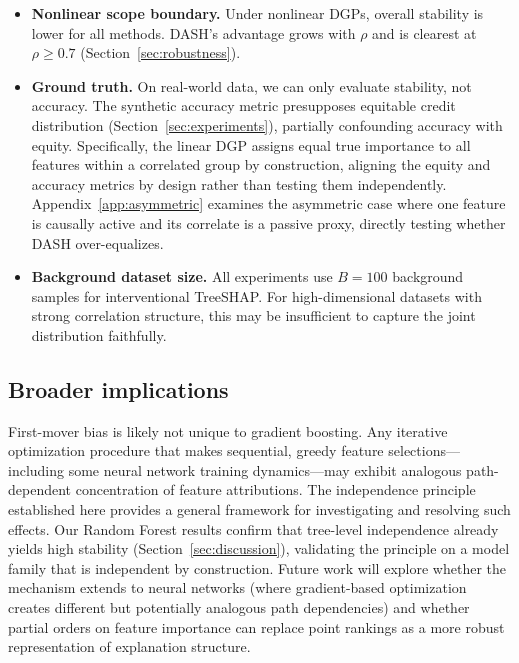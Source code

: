 \documentclass[11pt]{article}
\newcommand{\dash}{\textsc{DASH}}
\newcommand{\rhovar}{\rho}
\begin{document}
\begin{itemize}
    where diagonal entries are main effects and off-diagonal entries
    are pairwise interactions. Averaging these tensors element-wise
    across the ensemble would yield stable interaction estimates
    by the same independence argument. The computational cost is
    $O(TLD^2)$ per model (vs.\ $O(TLD)$ for standard SHAP), making
    this practical for moderate $P$ but expensive for large feature
    spaces.
  \item \textbf{Nonlinear scope boundary.} Under nonlinear DGPs,
    overall stability is lower for all methods. \dash{}'s advantage
    grows with $\rhovar$ and is clearest at $\rhovar \geq 0.7$
    (Section~\ref{sec:robustness}).
  \item \textbf{Ground truth.} On real-world data, we can only evaluate
    stability, not accuracy. The synthetic accuracy metric presupposes
    equitable credit distribution (Section~\ref{sec:experiments}),
    partially confounding accuracy with equity. Specifically, the
    linear DGP assigns equal true importance to all features within a
    correlated group by construction, aligning the equity and accuracy
    metrics by design rather than testing them independently.
    Appendix~\ref{app:asymmetric} examines the asymmetric case where
    one feature is causally active and its correlate is a passive proxy,
    directly testing whether \dash{} over-equalizes.
  \item \textbf{Background dataset size.} All experiments use $B = 100$
    background samples for interventional TreeSHAP. For high-dimensional
    datasets with strong correlation structure, this may be insufficient
    to capture the joint distribution faithfully.
\end{itemize}

\subsection{Broader implications}

First-mover bias is likely not unique to gradient boosting. Any
iterative optimization procedure that makes sequential, greedy feature
selections---including some neural network training dynamics---may exhibit
analogous path-dependent concentration of feature attributions. The
independence principle established here provides a general framework for
investigating and resolving such effects. Our Random Forest results
confirm that tree-level independence already yields high stability
(Section~\ref{sec:discussion}), validating the principle on a model
family that is independent by construction. Future work will explore
whether the mechanism extends to neural networks (where gradient-based
optimization creates different but potentially analogous path
dependencies) and whether partial orders on feature importance can
replace point rankings as a more robust representation of explanation
structure.
\end{document}
